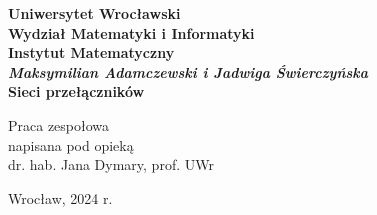 \documentclass[a4paper]{article}
\theoremstyle{definition}
\begin{document}

\newpage
\thispagestyle{empty}
\begin{center}
\textbf{\large Uniwersytet Wrocławski\\
Wydział Matematyki i Informatyki\\
Instytut Matematyczny}\\
\vspace{4cm}
\textbf{\textit{\large Maksymilian Adamczewski i Jadwiga Świerczyńska}\\
\vspace{0.5cm}
{\Large Sieci przełączników}}\\
\end{center}
\vspace{3cm}
{\large \hspace*{6.5cm}Praca zespołowa\\
\hspace*{6.5cm}napisana pod opieką\\
\hspace*{6.5cm}dr. hab. Jana Dymary, prof. UWr }\\
\vfill
\begin{center}
{\large Wrocław, 2024 r.}\\
\end{center}


\newpage

\null\vfill

\begin{abstract}
    W poniższej pracy przedstawiamy definicje przełącznika oraz sieci przełączników. Najpierw pokazujemy konstrukcje sieci realizujących symetrię, przesunięcie cykliczne czy dowolną permutację. Następnie przedstawiamy konstrukcję sieci Beneša--Waksmana realizującą wszystkie permutacje oraz jej optymalizację. Na końcu konstruujemy sieć realizującą wszystkie przesunięcia cykliczne oraz przesunięcia cykliczne o potęgi 2.  
\end{abstract}

\vfill




\tableofcontents

\newpage


\end{document}
